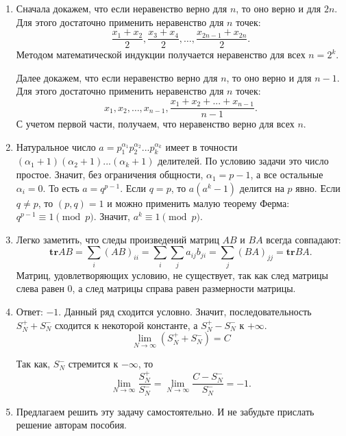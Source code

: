 \begin{enumerate}
\item Сначала докажем, что если неравенство верно для $n$, то оно верно и для $2n$. Для этого достаточно применить неравенство для $n$ точек:
$$\frac{x_1 + x_2}{2}, \frac{x_3 + x_4}{2}, \ldots, \frac{x_{2n-1} + x_{2n}}{2}.$$
Методом математической индукции получается неравенство для всех $n = 2^k$.

Далее докажем, что если неравенство верно для $n$, то оно верно и для $n-1$. Для этого достаточно применить неравенство для $n$ точек:
$$x_1, x_2, \ldots, x_{n-1}, \frac{x_1 + x_2 + ... + x_{n-1}}{n-1}.$$
С учетом первой части, получаем, что неравенство верно для всех $n$.

\item Натуральное число $a = p_1^{\alpha_1} p_2^{\alpha_2} ... p_k^{\alpha_k}$ имеет в точности $(\alpha_1 + 1) (\alpha_2 + 1) ... (\alpha_k + 1)$ делителей. По условию задачи это число простое. Значит,  без ограничения общности, $\alpha_1 = p - 1$, а все остальные $\alpha_i = 0$. То есть $a = q ^ {p-1}$. Если $q = p$, то $a (a^k - 1)$ делится на $p$ явно. Если $q \neq p$, то $(p, q) = 1$ и можно применить малую теорему Ферма: $q^{p-1} \equiv 1 \pmod p$. Значит, $a^k \equiv 1 \pmod p$.

\item Легко заметить, что следы произведений матриц $AB$ и $BA$ всегда совпадают:
$$\mathbf{tr} AB = \sum_i (AB)_{ii} = \sum_i \sum_j a_{ij} b_{ji} =  \sum_j (BA)_{jj} = \mathbf{tr} BA.$$
Матриц, удовлетворяющих условию, не существует, так как след матрицы слева равен 0, а след матрицы справа равен размерности матрицы.

\item Ответ: $-1$. Данный ряд сходится условно. Значит, последовательность $S_N^{+}+S_N^{-}$ сходится к некоторой константе, а $S_N^{+}-S_N^{-}$ к $+\infty$. $$\lim\limits_{N \rightarrow \infty}(S_N^{+}+S_N^{-}) = C$$

Так как, $S_N^{-}$ стремится к $-\infty$, то 
$$\lim\limits_{N \rightarrow \infty} \frac{S_N^{+}}{S_N^{-}} = \lim\limits_{N \rightarrow \infty} \frac{C - S_N^{-}}{S_N^{-}} = -1.$$

\item Предлагаем решить эту задачу самостоятельно. И не забудьте прислать решение авторам пособия.

\end{enumerate}